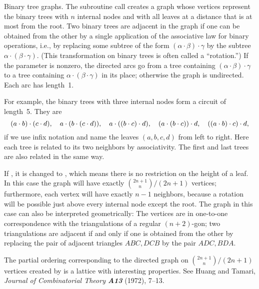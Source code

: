 Binary tree graphs. The subroutine call
creates a graph whose vertices represent the binary trees with $n$ internal
nodes and with all leaves at a distance that is at most 
from the root. Two binary trees are adjacent in the graph if
one can be obtained from the other by a single application of the
associative law for binary operations, i.e., by replacing some subtree
of the form $(\alpha\cdot\beta)\cdot\gamma$ by the subtree $\alpha\cdot
(\beta\cdot\gamma)$. (This transformation on binary trees is often
called a ``rotation.'') If the  parameter is nonzero, the
directed arcs go from a tree containing $(\alpha\cdot\beta)\cdot\gamma$
to a tree containing $\alpha\cdot(\beta\cdot\gamma)$ in its place; otherwise
the graph is undirected. Each arc has length~1.

For example, the binary trees with three internal nodes form a circuit of
length~5. They are
$$\mathcode`.="2201 %
(a.b).(c.d),\quad a.(b.(c.d)),\quad a.((b.c).d),\quad (a.(b.c)).d,\quad
((a.b).c).d,$$
if we use infix notation and name the leaves $(a,b,c,d)$ from left to right.
Here each tree is related to its two neighbors by associativity. The
first and last trees are also related in the same way.

If , it is changed to , which means there
is no
restriction on the height of a leaf. In this case the graph will have
exactly ${2n+1\choose n}/ (2n+1)$ vertices; furthermore, each vertex
will have exactly $n-1$ neighbors, because a rotation will be possible
just above every internal node except the root.  The graph in this
case can also be interpreted geometrically: The vertices are in
one-to-one correspondence with the triangulations of a regular
$(n+2)$-gon; two triangulations are adjacent if and only if one is obtained
from the other by replacing the pair of adjacent triangles $ABC,DCB$
by the pair $ADC,BDA$.

The partial ordering corresponding to the directed graph on
${2n+1\choose n}/(2n+1)$ vertices created by 
is a lattice with interesting properties. See Huang and Tamari,
{\sl Journal of Combinatorial Theory\/ \bf A13} (1972), 7--13.

